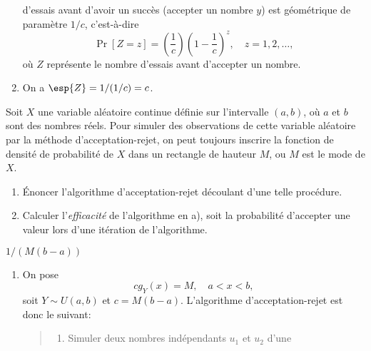 \begin{exercice}
\begin{sol}
\begin{enumerate}
      d'essais avant d'avoir un succès (accepter un nombre $y$) est
      géométrique de paramètre $1/c$, c'est-à-dire
      \begin{displaymath}
        \Pr[Z = z] =
        \left( \frac{1}{c} \right)
        \left( 1 - \frac{1}{c} \right)^z, \quad z = 1, 2, \dots,
      \end{displaymath}
      où $Z$ représente le nombre d'essais avant d'accepter un nombre.
    \item On a $\esp{Z} = 1/(1/c) = c$.
    \end{enumerate}
  \end{sol}
\end{exercice}

\begin{exercice}
  \label{ex:simulation:mode}
  Soit $X$ une variable aléatoire continue définie sur l'intervalle
  $(a, b)$, où $a$ et $b$ sont des nombres réels. Pour simuler des
  observations de cette variable aléatoire par la méthode
  d'acceptation-rejet, on peut toujours inscrire la fonction de
  densité de probabilité de $X$ dans un rectangle de hauteur $M$, ou
  $M$ est le mode de $X$.
  \begin{enumerate}
  \item Énoncer l'algorithme d'acceptation-rejet découlant d'une telle
    procédure.
  \item Calculer l'\emph{efficacité} de l'algorithme en a), soit la
    probabilité d'accepter une valeur lors d'une itération de
    l'algorithme.
  \end{enumerate}
  \begin{rep}
    \begin{inparaenum}
    \item $1/(M (b - a))$
    \end{inparaenum}
  \end{rep}
  \begin{sol}
    \begin{enumerate}
    \item On pose
      \begin{displaymath}
        c g_Y(x) = M, \quad a < x < b,
      \end{displaymath}
      soit $Y \sim U(a, b)$ et $c = M (b - a)$. L'algorithme
      d'acceptation-rejet est donc le suivant:
      \begin{quote}
        \begin{enumerate}[1.]
        \item Simuler deux nombres indépendants $u_1$ et $u_2$ d'une

\end{enumerate}
\end{quote}
\end{enumerate}
\end{sol}
\end{exercice}
